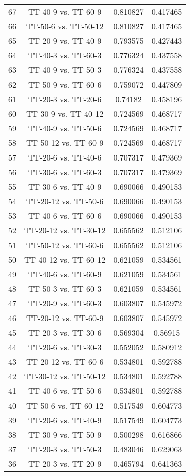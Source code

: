 \documentclass[a4paper,10pt]{article}
\begin{document}
\begin{landscape}
\begin{table}[!htp]
\begin{tabular}{cccc}
67&TT-40-9 vs. TT-60-9&0.810827&0.417465\\
66&TT-50-6 vs. TT-50-12&0.810827&0.417465\\
65&TT-20-9 vs. TT-40-9&0.793575&0.427443\\
64&TT-40-3 vs. TT-60-3&0.776324&0.437558\\
63&TT-40-9 vs. TT-50-3&0.776324&0.437558\\
62&TT-50-9 vs. TT-60-6&0.759072&0.447809\\
61&TT-20-3 vs. TT-20-6&0.74182&0.458196\\
60&TT-30-9 vs. TT-40-12&0.724569&0.468717\\
59&TT-40-9 vs. TT-50-6&0.724569&0.468717\\
58&TT-50-12 vs. TT-60-9&0.724569&0.468717\\
57&TT-20-6 vs. TT-40-6&0.707317&0.479369\\
56&TT-30-6 vs. TT-60-3&0.707317&0.479369\\
55&TT-30-6 vs. TT-40-9&0.690066&0.490153\\
54&TT-20-12 vs. TT-50-6&0.690066&0.490153\\
53&TT-40-6 vs. TT-60-6&0.690066&0.490153\\
52&TT-20-12 vs. TT-30-12&0.655562&0.512106\\
51&TT-50-12 vs. TT-60-6&0.655562&0.512106\\
50&TT-40-12 vs. TT-60-12&0.621059&0.534561\\
49&TT-40-6 vs. TT-60-9&0.621059&0.534561\\
48&TT-50-3 vs. TT-60-3&0.621059&0.534561\\
47&TT-20-9 vs. TT-60-3&0.603807&0.545972\\
46&TT-20-12 vs. TT-60-9&0.603807&0.545972\\
45&TT-20-3 vs. TT-30-6&0.569304&0.56915\\
44&TT-20-6 vs. TT-30-3&0.552052&0.580912\\
43&TT-20-12 vs. TT-60-6&0.534801&0.592788\\
42&TT-30-12 vs. TT-50-12&0.534801&0.592788\\
41&TT-40-6 vs. TT-50-6&0.534801&0.592788\\
40&TT-50-6 vs. TT-60-12&0.517549&0.604773\\
39&TT-20-6 vs. TT-40-9&0.517549&0.604773\\
38&TT-30-9 vs. TT-50-9&0.500298&0.616866\\
37&TT-20-3 vs. TT-50-3&0.483046&0.629063\\
36&TT-20-3 vs. TT-20-9&0.465794&0.641363\\

\end{tabular}
\end{table}
\end{landscape}
\end{document}
